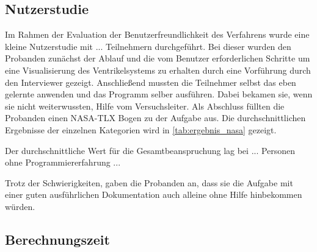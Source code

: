 \subsection{Nutzerstudie}


Im Rahmen der Evaluation der Benutzerfreundlichkeit des Verfahrens wurde eine kleine Nutzerstudie mit ... Teilnehmern durchgeführt. Bei dieser wurden den Probanden zunächst der Ablauf und die vom Benutzer erforderlichen Schritte um eine Visualisierung des Ventrikelsystems zu erhalten durch eine Vorführung durch den Interviewer gezeigt. Anschließend mussten die Teilnehmer selbst das eben gelernte anwenden und das Programm selber ausführen. Dabei bekamen sie, wenn sie nicht weiterwussten, Hilfe vom Versuchsleiter. Als Abschluss füllten die Probanden einen NASA-TLX Bogen zu der Aufgabe aus. Die durchschnittlichen Ergebnisse der einzelnen Kategorien wird in \autoref{tab:ergebnis_nasa} gezeigt.


\begin{table}[h]
\centering
{}
\caption{Durchschnittlichen Ergebnisse des NASA-TLX Bogens}
\label{tab:ergebnis_nasa}
\end{table}


Der durchschnittliche Wert für die Gesamtbeanspruchung lag bei ... Personen ohne Programmiererfahrung ...

 
Trotz der Schwierigkeiten,  gaben die Probanden an, dass sie die Aufgabe mit einer guten ausführlichen Dokumentation auch alleine ohne Hilfe hinbekommen würden.


\subsection{Berechnungszeit}


